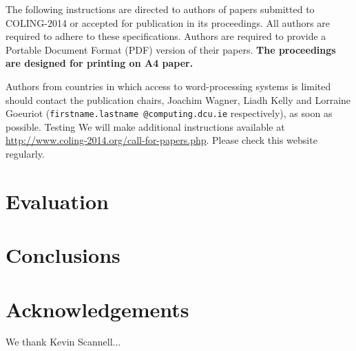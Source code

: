 \documentclass[11pt]{article}
\begin{document}
%
% 

The following instructions are directed to authors of papers submitted
to COLING-2014 or accepted for publication in its proceedings. All
authors are required to adhere to these specifications. Authors are
required to provide a Portable Document Format (PDF) version of their
papers. \textbf{The proceedings are designed for printing on A4
  paper.}

Authors from countries in which access to word-processing systems is
limited should contact the publication chairs,
Joachim Wagner, Liadh Kelly and Lorraine Goeuriot
(\texttt{firstname.lastname @computing.dcu.ie} respectively),
as soon as possible.
Testing
We will make additional instructions available at
\url{http://www.coling-2014.org/call-for-papers.php}. Please check
this website regularly.


\section{Evaluation}

\section{Conclusions}


\section*{Acknowledgements}

We thank Kevin Scannell... 



\end{document}
